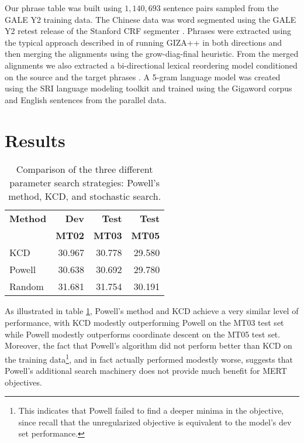 \documentclass[11pt]{article}
\begin{document}
Our phrase table was built using $1,140,693$ sentence pairs sampled from the GALE Y2 training data.  The Chinese data was word segmented using the GALE Y2 retest release of the Stanford CRF segmenter \cite{tseng05}.  Phrases were extracted using the typical approach described in  of running GIZA++ \cite{och03} in both directions and then merging the alignments using the grow-diag-final heuristic. From the merged alignments we also extracted a bi-directional lexical reordering model conditioned on the source and the target phrases \cite{tillmann04} \cite{koehn2007}. A 5-gram language model was created using the SRI language modeling toolkit \cite{stolcke02srilm} and trained using the Gigaword corpus and English sentences from the parallel data. 

  


\section{Results}

\begin{table}
\begin{center}
\begin{tabular}{|l|rrr|}
\hline \bf Method  & \bf Dev  & \bf Test & \bf Test \\ 
                   & \bf MT02 & \bf MT03 & \bf MT05 \\ \hline
KCD        & 30.967 & 30.778 & 29.580 \\
Powell     & 30.638 & 30.692 & 29.780  \\
Random     & 31.681 & 31.754 & 30.191 \\
\hline
\end{tabular}
\end{center}
\caption{
\label{searchstrat}
Comparison of the three different parameter search strategies: Powell's method, KCD, and stochastic search.}
\end{table}

As illustrated in table \ref{searchstrat}, Powell's method and KCD achieve a very similar level of performance, with KCD modestly outperforming Powell on the MT03 test set while Powell modestly outperforms coordinate descent on the MT05 test set. Moreover, the fact that Powell's algorithm did not perform better than KCD on the training data\footnote{This indicates that Powell failed to find a deeper minima in the objective, since recall that the unregularized objective is equivalent to the model's dev set performance.}, and in fact actually performed modestly worse, suggests that Powell's additional search machinery does not provide much benefit for MERT objectives. 
\end{document}
